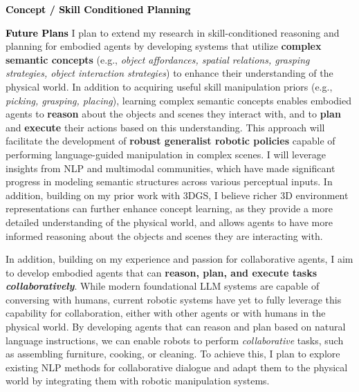 \documentclass[11pt]{article}
\newcommand{\statement}[1]{\medskip\noindent
  \textcolor{black}{\textbf{#1}}\space
}
\newif\ifcomments
\newcommand{\todo}[1]{\ifcomments\textcolor{red}{TODO: #1}\fi}
\begin{document}
\statement{Concept / Skill Conditioned Planning} \todo{Talk about the current project}

\statement{Future Plans} I plan to extend my research in skill-conditioned reasoning and planning for embodied agents by developing systems that utilize \textbf{complex semantic concepts} (e.g., \textit{object affordances, spatial relations, grasping strategies, object interaction strategies}) to enhance their understanding of the physical world. In addition to acquiring useful skill manipulation priors (e.g., \textit{picking, grasping, placing}), learning complex semantic concepts enables embodied agents to \textbf{reason} about the objects and scenes they interact with, and to \textbf{plan} and \textbf{execute} their actions based on this understanding. This approach will facilitate the development of \textbf{robust generalist robotic policies} capable of performing language-guided manipulation in complex scenes. I will leverage insights from NLP and multimodal communities, which have made significant progress in modeling semantic structures across various perceptual inputs. In addition, building on my prior work with 3DGS, I believe richer 3D environment representations can further enhance concept learning, as they provide a more detailed understanding of the physical world, and allows agents to have more informed reasoning about the objects and scenes they are interacting with.

In addition, building on my experience and passion for collaborative agents, I aim to develop embodied agents that can \textbf{reason, plan, and execute tasks \textit{collaboratively}}. While modern foundational LLM systems are capable of conversing with humans, current robotic systems have yet to fully leverage this capability for collaboration, either with other agents or with humans in the physical world. By developing agents that can reason and plan based on natural language instructions, we can enable robots to perform \textit{collaborative} tasks, such as assembling furniture, cooking, or cleaning. To achieve this, I plan to explore existing NLP methods for collaborative dialogue and adapt them to the physical world by integrating them with robotic manipulation systems.


\todo{\href{https://drive.google.com/file/d/182f3f_YGr1-W4zfq1N4F_MrICwAQVMVS/view}{This} example is very good at connecting the past with present to future. Might want to look into this format instead. I currently just follow the \href{https://docs.google.com/document/d/1R5aB2w95CGDWarm4iVr6lagvnJLkYbXwCz3KeQXbokU/edit?tab=t.0}{format} of the previous SOP, where I just list out the projects I have done, and then connect them to the future. Maybe we can have something like this: 1. \textbf{More robust environment representations enable robots to understand complex scenes 2. \textbf{Language-driven goal reasoning enable robots to perform long-horiozn tasks in complex environments}}. In each of those, talk about related previous research, and how current research is building on that, and how future research will build on that.}
\end{document}
